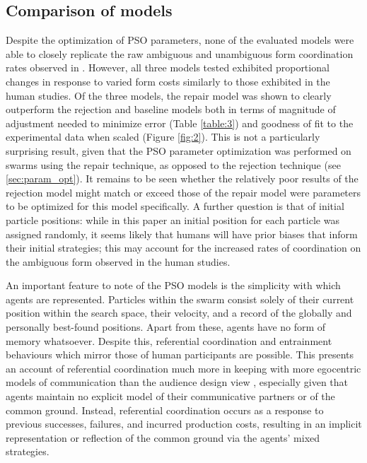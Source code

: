 \documentclass[12pt,a4paper]{article}
\begin{document}
\subsection{Comparison of models}
Despite the optimization of PSO parameters, none of the evaluated models were able to closely replicate the raw ambiguous and unambiguous form coordination rates observed in \citeauthor{rohde2012}. However, all three models tested exhibited proportional changes in response to varied form costs similarly to those exhibited in the human studies. Of the three models, the repair model was shown to clearly outperform the rejection and baseline models both in terms of magnitude of adjustment needed to minimize error (Table \ref{table:3}) and goodness of fit to the experimental data when scaled (Figure \ref{fig:2}). This is not a particularly surprising result, given that the PSO parameter optimization was performed on swarms using the repair technique, as opposed to the rejection technique (see \ref{sec:param_opt}). It remains to be seen whether the relatively poor results of the rejection model might match or exceed those of the repair model were parameters to be optimized for this model specifically. A further question is that of initial particle positions: while in this paper an initial position for each particle was assigned randomly, it seems likely that humans will have prior biases that inform their initial strategies; this may account for the increased rates of coordination on the ambiguous form observed in the \citeauthor{rohde2012} human studies.

An important feature to note of the PSO models is the simplicity with which agents are represented. Particles within the swarm consist solely of their current position within the search space, their velocity, and a record of the globally and personally best-found positions. Apart from these, agents have no form of memory whatsoever. Despite this, referential coordination and entrainment behaviours which mirror those of human participants are possible. This presents an account of referential coordination much more in keeping with more egocentric models of communication \citep{horton1996} than the audience design view \citep{clark1982}, especially given that agents maintain no explicit model of their communicative partners or of the common ground. Instead, referential coordination occurs as a response to previous successes, failures, and incurred production costs, resulting in an implicit representation or reflection of the common ground via the agents' mixed strategies. 
\end{document}
